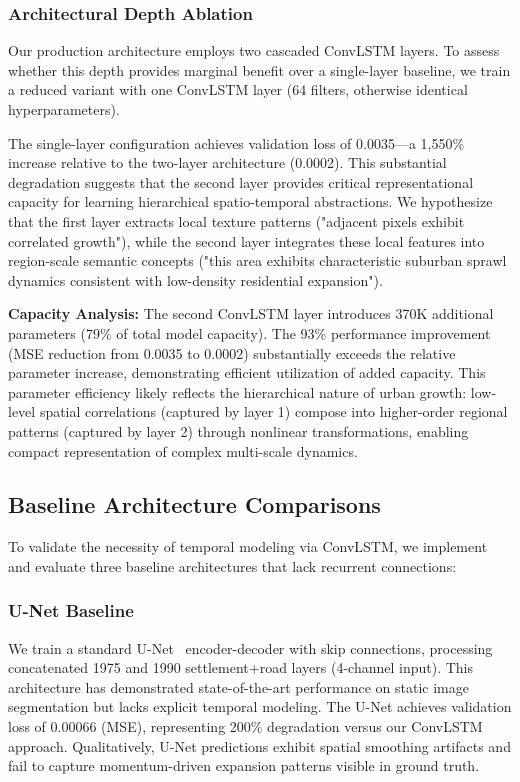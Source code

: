 \documentclass[conference]{IEEEtran}
\begin{document}
\subsubsection{Architectural Depth Ablation}
Our production architecture employs two cascaded ConvLSTM layers. To assess whether this depth provides marginal benefit over a single-layer baseline, we train a reduced variant with one ConvLSTM layer (64 filters, otherwise identical hyperparameters).

The single-layer configuration achieves validation loss of 0.0035---a 1,550\% increase relative to the two-layer architecture (0.0002). This substantial degradation suggests that the second layer provides critical representational capacity for learning hierarchical spatio-temporal abstractions. We hypothesize that the first layer extracts local texture patterns ("adjacent pixels exhibit correlated growth"), while the second layer integrates these local features into region-scale semantic concepts ("this area exhibits characteristic suburban sprawl dynamics consistent with low-density residential expansion").

\textbf{Capacity Analysis:} The second ConvLSTM layer introduces 370K additional parameters (79\% of total model capacity). The 93\% performance improvement (MSE reduction from 0.0035 to 0.0002) substantially exceeds the relative parameter increase, demonstrating efficient utilization of added capacity. This parameter efficiency likely reflects the hierarchical nature of urban growth: low-level spatial correlations (captured by layer 1) compose into higher-order regional patterns (captured by layer 2) through nonlinear transformations, enabling compact representation of complex multi-scale dynamics.

\subsection{Baseline Architecture Comparisons}

To validate the necessity of temporal modeling via ConvLSTM, we implement and evaluate three baseline architectures that lack recurrent connections:

\subsubsection{U-Net Baseline}
We train a standard U-Net~\cite{ronneberger2015} encoder-decoder with skip connections, processing concatenated 1975 and 1990 settlement+road layers (4-channel input). This architecture has demonstrated state-of-the-art performance on static image segmentation but lacks explicit temporal modeling. The U-Net achieves validation loss of 0.00066 (MSE), representing 200\% degradation versus our ConvLSTM approach. Qualitatively, U-Net predictions exhibit spatial smoothing artifacts and fail to capture momentum-driven expansion patterns visible in ground truth.
\end{document}
